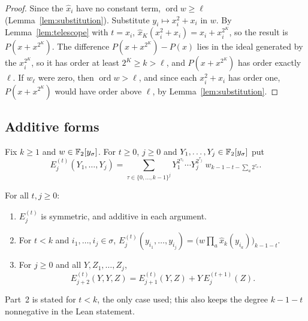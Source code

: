 \begin{proof}
Since the \(\hat x_i\) have no constant term, \(\operatorname{ord}w\ge\ell\)
(Lemma~\ref{lem:substitution}). Substitute \(y_i\mapsto x_i^2+x_i\) in \(w\). By
Lemma~\ref{lem:telescope} with \(t=x_i\), \(\hat x_K(x_i^2+x_i)=x_i+x_i^{2^K}\), so
the result is \(P(x+x^{2^K})\). The difference \(P(x+x^{2^K})-P(x)\) lies in the
ideal generated by the \(x_i^{2^K}\), so it has order at least \(2^K\ge k>\ell\),
and \(P(x+x^{2^K})\) has order exactly \(\ell\). If \(w_\ell\) were zero, then
\(\operatorname{ord}w>\ell\), and since each \(x_i^2+x_i\) has order one,
\(P(x+x^{2^K})\) would have order above \(\ell\), by Lemma~\ref{lem:substitution}.
\end{proof}

\subsection{Additive forms}

Fix \(k\ge1\) and \(w\in\mathbb F_2[y_\sigma]\). For \(t\ge0\), \(j\ge0\) and
\(Y_1,\ldots,Y_j\in\mathbb F_2[y_\sigma]\) put
\[
 E^{(t)}_j(Y_1,\ldots,Y_j)=\sum_{\tau\in\{0,\ldots,k-1\}^j}
 Y_1^{2^{\tau_1}}\cdots Y_j^{2^{\tau_j}}\;w_{k-1-t-\sum_a2^{\tau_a}} .
\]

\begin{lemma}[Forms]\label{lem:forms}
For all \(t,j\ge0\):
\begin{enumerate}
 \item \(E^{(t)}_j\) is symmetric, and additive in each argument.
 \item For \(t<k\) and \(i_1,\ldots,i_j\in\sigma\),
 \(E^{(t)}_j(y_{i_1},\ldots,y_{i_j})=\bigl(w\prod_a\hat x_k(y_{i_a})\bigr)_{k-1-t}\).
 \item For \(j\ge0\) and all \(Y,Z_1,\ldots,Z_j\),
 \[
  E^{(t)}_{j+2}(Y,Y,Z)=E^{(t)}_{j+1}(Y,Z)+Y\,E^{(t+1)}_j(Z).
 \]
\end{enumerate}
\end{lemma}

\noindent Part~2 is stated for \(t<k\), the only case used; this also keeps the
degree \(k-1-t\) nonnegative in the Lean statement.

